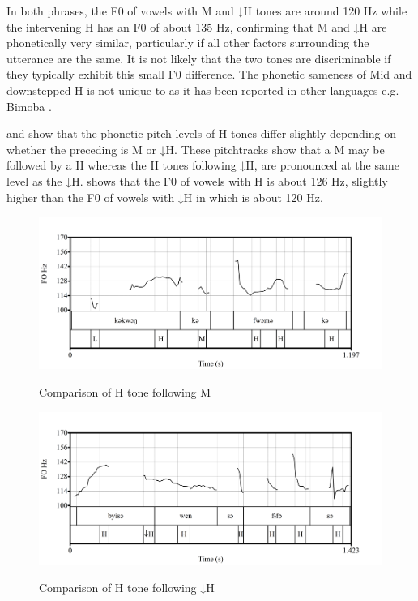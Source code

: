 \documentclass[output=paper,modfonts,nonflat,
colorlinks, citecolor=brown,
]{langsci/langscibook}
\begin{document}
  
  
In both phrases, the F0 of vowels with M and ↓H tones are around 120 Hz while the intervening H  has an F0 of about 135 Hz, confirming that M and ↓H are phonetically very similar, particularly if all other factors surrounding the utterance are the same. It is not likely that the two tones are discriminable if they typically exhibit this small F0 difference. The phonetic sameness of Mid and downstepped H is not unique to  as it has been reported in other languages e.g. Bimoba \citep{Snider1998}. 
	
 and  show that the phonetic pitch levels of H tones differ slightly depending on whether the preceding  is M or ↓H. These pitchtracks show that a M  may be followed by a H  whereas the H tones following ↓H, are pronounced at the same level as the ↓H.  shows that the F0 of vowels with H  is about 126 Hz, slightly higher than the F0 of vowels with ↓H in  which is about 120 Hz. 

\begin{figure}[p]
	{\includegraphics[width=.95\textwidth]{figures/fig-akumbu-3a}}\\
    \caption{Comparison of H tone following M} \label{fig:akumbu:3}
\end{figure}
\begin{figure}
	{\includegraphics[width=.95\textwidth]{figures/fig-akumbu-3b}}
    \caption{Comparison of H tone following ↓H} \label{fig:akumbu:4}
\end{figure}
\end{document}
